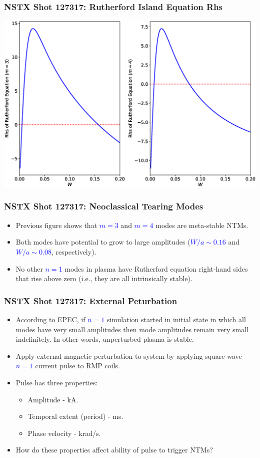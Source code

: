 \documentclass{beamer}
\newcommand{\blue}[1]{\textcolor{blue}{#1}}
\begin{document}
\begin{frame}
\frametitle{NSTX Shot 127317: Rutherford Island Equation Rhs}

\begin{center}
\includegraphics[width=\textwidth]{Rhs.eps}
\end{center}
\end{frame}

\begin{frame}
\frametitle{NSTX Shot 127317: Neoclassical Tearing Modes}

\begin{itemize}
\item Previous figure shows that \blue{$m=3$} and \blue{$m=4$} modes are meta-stable NTMs.
\item Both modes have potential to grow to large amplitudes (\blue{$W/a\sim 0.16$} and \blue{$W/a\sim 0.08$},
respectively). 
\item No other \blue{$n=1$} modes in plasma have Rutherford equation right-hand sides that rise above zero (i.e.,
they are all intrinsically stable).
\end{itemize}
\end{frame}

\begin{frame}
\frametitle{NSTX Shot 127317: External Peturbation}
\begin{itemize}
\item According to EPEC, if \blue{$n=1$} simulation started in initial state in which all modes have very small
amplitudes then mode amplitudes remain very small indefinitely. In other words, unperturbed plasma is
stable.
\item Apply external magnetic perturbation to system by applying square-wave \blue{$n=1$} current pulse to RMP coils. 
\item Pulse has three properties:
\begin{itemize}
\item Amplitude - kA.
\item Temporal extent (period)  - ms.
\item Phase velocity - krad/s.
\end{itemize}
\item How do these properties affect ability of pulse to trigger NTMs?
\end{itemize}

\end{frame}
\end{document}

